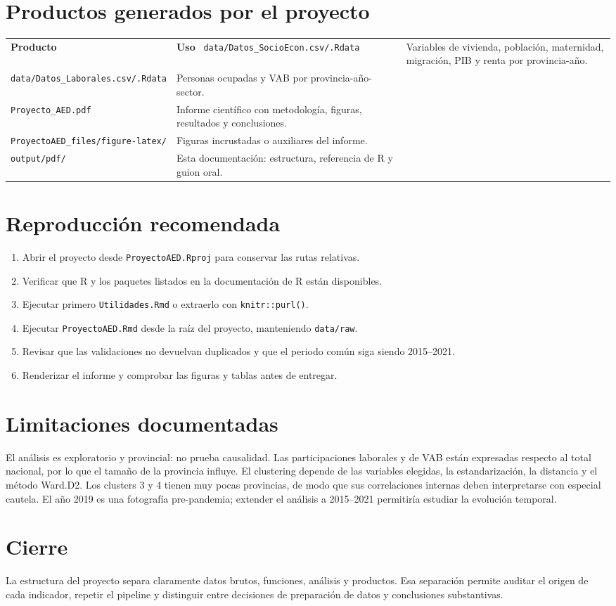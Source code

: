 \documentclass[11pt,a4paper]{article}
\newcommand{\code}[1]{\texttt{\small #1}}
\begin{document}
\section{Productos generados por el proyecto}
\begin{longtable}{p{}p{}}
\toprule\textbf{Producto} & \textbf{Uso}\
\midrule
\endhead
\code{data/Datos\_SocioEcon.csv/.Rdata} & Variables de vivienda, población, maternidad, migración, PIB y renta por provincia-año.\\
\code{data/Datos\_Laborales.csv/.Rdata} & Personas ocupadas y VAB por provincia-año-sector.\\
\code{Proyecto\_AED.pdf} & Informe científico con metodología, figuras, resultados y conclusiones.\\
\code{ProyectoAED\_files/figure-latex/} & Figuras incrustadas o auxiliares del informe.\\
\code{output/pdf/} & Esta documentación: estructura, referencia de R y guion oral.\\
\bottomrule
\end{longtable}

\section{Reproducción recomendada}
\begin{enumerate}[leftmargin=1.7em]
\item Abrir el proyecto desde \code{ProyectoAED.Rproj} para conservar las rutas relativas.
\item Verificar que R y los paquetes listados en la documentación de R están disponibles.
\item Ejecutar primero \code{Utilidades.Rmd} o extraerlo con \code{knitr::purl()}.
\item Ejecutar \code{ProyectoAED.Rmd} desde la raíz del proyecto, manteniendo \code{data/raw}.
\item Revisar que las validaciones no devuelvan duplicados y que el periodo común siga siendo 2015--2021.
\item Renderizar el informe y comprobar las figuras y tablas antes de entregar.
\end{enumerate}

\section{Limitaciones documentadas}
El análisis es exploratorio y provincial: no prueba causalidad. Las participaciones laborales y de VAB están expresadas respecto al total nacional, por lo que el tamaño de la provincia influye. El clustering depende de las variables elegidas, la estandarización, la distancia y el método Ward.D2. Los clusters 3 y 4 tienen muy pocas provincias, de modo que sus correlaciones internas deben interpretarse con especial cautela. El año 2019 es una fotografía pre-pandemia; extender el análisis a 2015--2021 permitiría estudiar la evolución temporal.

\section*{Cierre}
La estructura del proyecto separa claramente datos brutos, funciones, análisis y productos. Esa separación permite auditar el origen de cada indicador, repetir el pipeline y distinguir entre decisiones de preparación de datos y conclusiones substantivas.
\end{document}
